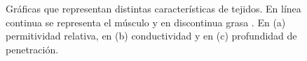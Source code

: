 \begin{figure}[!htb]
    \centering
    \caption{Gráficas que representan distintas características de tejidos. En línea continua se representa el músculo y en discontinua grasa \cite{yang2}. En (a) permitividad relativa, en (b) conductividad y en (c) profundidad de penetración.}
    \label{fig:fig3.1}
\end{figure}

